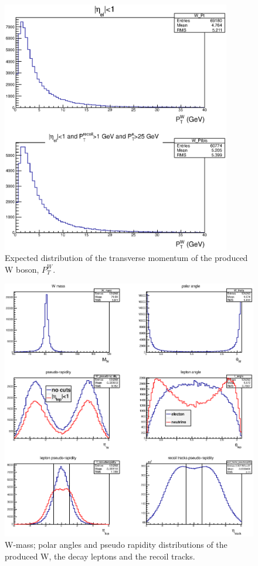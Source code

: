 \documentclass[12pt]{article}
\begin{document}
\begin{figure}[tbh]
\begin{center}
\includegraphics[width=10cm]{images/W_Pt}
\end{center}
\caption{Expected distribution of the transverse momentum of the produced W boson, $P^W_T$.}
\label{fig:MC_W_Pt} 
\end{figure}

\begin{figure}[tbh]
\begin{center}
\includegraphics[width=14cm]{images/W_rapidity}
\end{center}
\caption{W-mass; polar angles and pseudo rapidity distributions of the produced W, the decay leptons and the recoil tracks.}
\label{fig:MC_W_eta} 
\end{figure}
\end{document}

